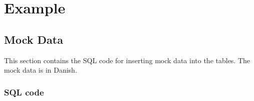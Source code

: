 \chapter{Example}

\section{Mock Data}
This section contains the SQL code for inserting mock data into the tables. The mock data is in Danish.

\subsection{SQL code}

\inputminted{sql}{codefiles/ViewHotelFacilities.sql}
\label{label:sql-view-hotel-facilities}
